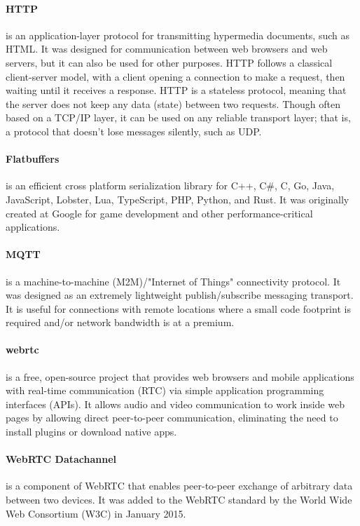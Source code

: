 \paragraph{HTTP}
is an application-layer protocol for transmitting hypermedia documents, such as HTML.
It was designed for communication between web browsers and web servers, but it can also be used for other purposes.
HTTP follows a classical client-server model, with a client opening a connection to make a request,
then waiting until it receives a response.
HTTP is a stateless protocol, meaning that the server does not keep any data (state) between two requests.
Though often based on a TCP/IP layer, it can be used on any reliable transport layer;
that is, a protocol that doesn't lose messages silently, such as UDP.

\paragraph{Flatbuffers}
is an efficient cross platform serialization library for C++, C\#, C, Go, Java, JavaScript, Lobster, Lua, TypeScript, PHP, Python, and Rust.
It was originally created at Google for game development and other performance-critical applications.

\paragraph{MQTT}
is a machine-to-machine (M2M)/"Internet of Things" connectivity protocol.
It was designed as an extremely lightweight publish/subscribe messaging transport.
It is useful for connections with remote locations where a small code footprint is required and/or network bandwidth is at a premium.

\paragraph{webrtc}
is a free, open-source project that provides web browsers and mobile applications with real-time communication (RTC) via simple application programming interfaces (APIs).
It allows audio and video communication to work inside web pages by allowing direct peer-to-peer communication,
eliminating the need to install plugins or download native apps.

\paragraph{WebRTC Datachannel}
is a component of WebRTC that enables peer-to-peer exchange of arbitrary data between two devices.
It was added to the WebRTC standard by the World Wide Web Consortium (W3C) in January 2015.
